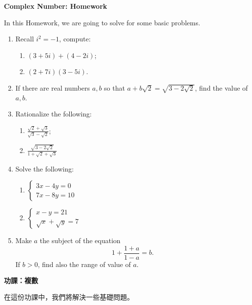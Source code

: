 \documentclass[12pt]{article}
\begin{document}
    \begin{center}
        \textbf{Complex Number: Homework}
    \end{center}

    In this Homework, we are going to solve for some basic problems.

    \begin{enumerate}
        \item Recall $i^2=-1$, compute:\begin{enumerate}
            \item $(3+5i)+(4-2i)$;
            \item $(2+7i)(3-5i)$.
        \end{enumerate}
        \item If there are real numbers $a,b$ so that $a+b\sqrt{2}=\sqrt{3-2\sqrt{2}}$, find the value of $a,b$.
        \item Rationalize the following:\begin{enumerate}
            \item $\frac{\sqrt{2}+\sqrt{3}}{\sqrt{3}-\sqrt{2}}$;
            \item $\frac{\sqrt{3-2\sqrt{2}}}{1+\sqrt{2}+\sqrt{3}}$
        \end{enumerate}
        \item Solve the following: \begin{enumerate}
            \item $\begin{cases}
                3x-4y=0\\
                7x-8y=10
            \end{cases}$
            \item $\begin{cases}
                x-y=21\\
                \sqrt{x}+\sqrt{y}=7
            \end{cases}$
        \end{enumerate}
        \item Make $a$ the subject of the equation $$1+\frac{1+a}{1-a}=b.$$ If $b>0$, find also the range of value of $a$.
    \end{enumerate}

    \newpage

    \begin{center}
        \textbf{功課：複數}
    \end{center}

    在這份功課中，我們將解決一些基礎問題。
\end{document}
